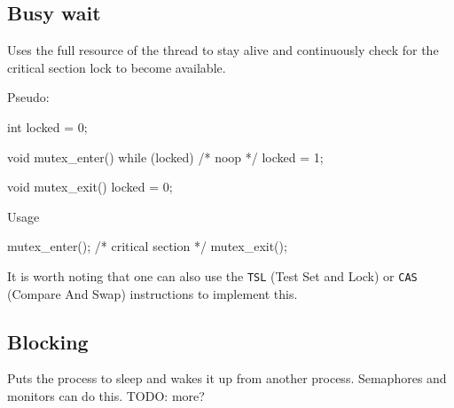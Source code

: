 
\subsection{Busy wait}
Uses the full resource of the thread to stay alive and continuously check for the critical section lock to become available.

Pseudo:
\begin{cpp}
int locked = 0;

void mutex_enter() {
  while (locked) { /* noop */ }
  locked = 1;
}

void mutex_exit() {
  locked = 0;
}
\end{cpp}

Usage
\begin{cpp}
mutex_enter();
/* critical section */
mutex_exit();
\end{cpp}

It is worth noting that one can also use the \texttt{TSL} (Test Set and Lock) or \texttt{CAS} (Compare And Swap) instructions to implement this.

\subsection{Blocking}
Puts the process to sleep and wakes it up from another process. Semaphores and monitors can do this. TODO: more?


